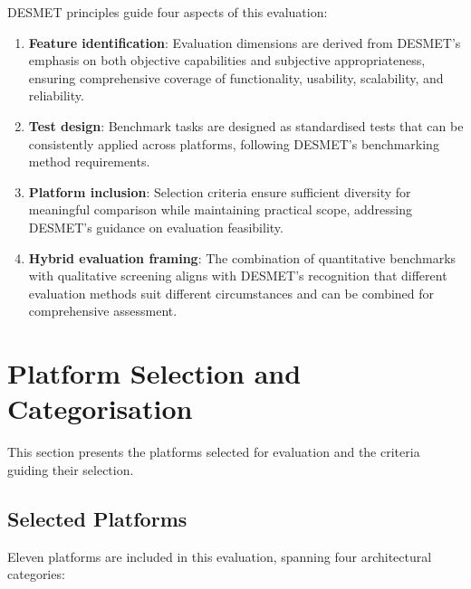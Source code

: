 \documentclass[]
{UCD_CS_FYP_Report}
\begin{document}
DESMET principles guide four aspects of this evaluation:

\begin{enumerate}
  \item \textbf{Feature identification}: Evaluation dimensions are derived from DESMET's emphasis on both objective capabilities and subjective appropriateness, ensuring comprehensive coverage of functionality, usability, scalability, and reliability.
  \item \textbf{Test design}: Benchmark tasks are designed as standardised tests that can be consistently applied across platforms, following DESMET's benchmarking method requirements.
  \item \textbf{Platform inclusion}: Selection criteria ensure sufficient diversity for meaningful comparison while maintaining practical scope, addressing DESMET's guidance on evaluation feasibility.
  \item \textbf{Hybrid evaluation framing}: The combination of quantitative benchmarks with qualitative screening aligns with DESMET's recognition that different evaluation methods suit different circumstances and can be combined for comprehensive assessment.
\end{enumerate}

\section{Platform Selection and Categorisation}

This section presents the platforms selected for evaluation and the criteria guiding their selection.

\subsection{Selected Platforms}

Eleven platforms are included in this evaluation, spanning four architectural categories:
\end{document}
